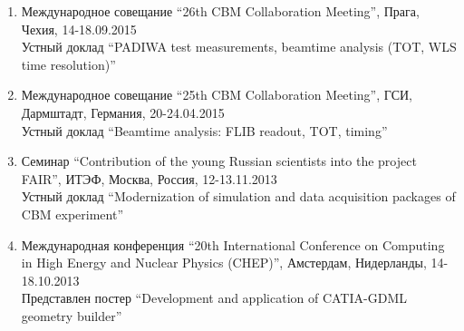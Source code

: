 \begin{enumerate}
\item Международное совещание ``26th CBM Collaboration Meeting'', Прага, Чехия, 14-18.09.2015 \\
Устный доклад ``PADIWA test measurements, beamtime analysis (TOT, WLS time resolution)''

\item Международное совещание ``25th CBM Collaboration Meeting'', ГСИ, Дармштадт, Германия, 20-24.04.2015 \\
Устный доклад ``Beamtime analysis: FLIB readout, TOT, timing''

\item Семинар ``Contribution of the young Russian scientists into the project FAIR'', ИТЭФ, Москва, Россия, 12-13.11.2013 \\
Устный доклад ``Modernization of simulation and data acquisition packages of CBM experiment''

\item Международная конференция ``20th International Conference on Computing in High Energy and Nuclear Physics (CHEP)'', Амстердам, Нидерланды, 14-18.10.2013 \\
Представлен постер ``Development and application of CATIA-GDML geometry builder''

\end{enumerate}
